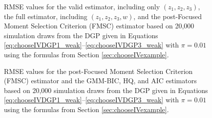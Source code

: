 \begin{figure}[h]
\centering
	
	\caption{RMSE values for the valid estimator, including only $(z_1, z_2, z_3)$, the full estimator, including $(z_1, z_2, z_3, w)$, and the post-Focused Moment Selection Criterion (FMSC) estimator based on 20,000 simulation draws from the DGP given in Equations \ref{eq:chooseIVDGP1_weak}--\ref{eq:chooseIVDGP3_weak} with $\pi = 0.01$ using the formulas from Section \ref{sec:chooseIVexample}.}
	\label{fig:chooseIVsim_RMSEbaseline_weak}
\end{figure}

\begin{figure}[h]
\centering
	
	\caption{RMSE values for the post-Focused Moment Selection Criterion (FMSC) estimator and the GMM-BIC, HQ, and AIC estimators based on 20,000 simulation draws from the DGP given in Equations \ref{eq:chooseIVDGP1_weak}--\ref{eq:chooseIVDGP3_weak} with $\pi = 0.01$ using the formulas from Section \ref{sec:chooseIVexample}.}
	\label{fig:chooseIVsim_RMSErelMSC_weak}
\end{figure}
